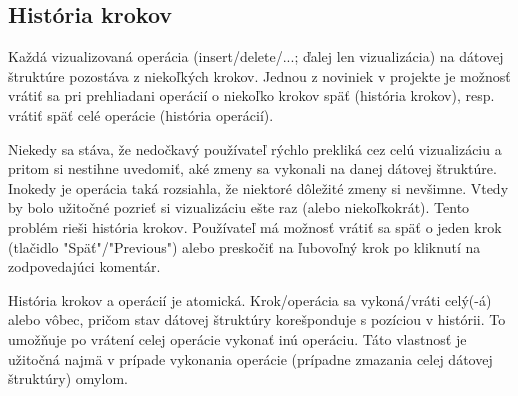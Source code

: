 \subsection{História krokov}
Každá vizualizovaná operácia (insert/delete/...; ďalej len vizualizácia) na 
dátovej štruktúre pozostáva
z niekoľkých krokov. Jednou z noviniek v projekte je možnosť vrátiť sa pri
prehliadani operácií o niekoľko krokov späť (história krokov), resp. vrátiť späť
celé operácie (história operácií).

Niekedy sa stáva, že nedočkavý používateľ rýchlo prekliká cez celú vizualizáciu a pritom si nestihne uvedomiť, aké zmeny sa vykonali na danej dátovej
štruktúre. Inokedy je operácia taká rozsiahla, že niektoré dôležité zmeny si
nevšimne. Vtedy by bolo užitočné pozrieť si vizualizáciu ešte raz (alebo
niekoľkokrát). Tento problém rieši história krokov. Používateľ má možnosť vrátiť
sa späť o jeden krok (tlačidlo "Späť"/"Previous") alebo preskočiť na ľubovoľný
krok po kliknutí na zodpovedajúci komentár.

História krokov a operácií je atomická. Krok/operácia sa vykoná/vráti celý(-á)
alebo vôbec, pričom stav dátovej štruktúry korešponduje s pozíciou v histórii.
To umožňuje po vrátení celej operácie vykonať inú operáciu. Táto vlastnosť je
užitočná najmä v prípade vykonania operácie (prípadne zmazania celej dátovej
štruktúry) omylom.

